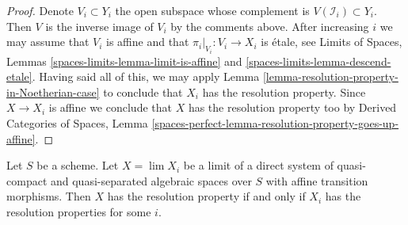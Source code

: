 \begin{proof}
Denote $V_i \subset Y_i$ the open subspace whose complement
is $V(\mathcal{I}_i) \subset Y_i$. Then $V$ is the inverse image
of $V_i$ by the comments above. After increasing $i$ we may assume
that $V_i$ is affine and that $\pi_i|_{V_i} : V_i \to X_i$ is 
\'etale, see
Limits of Spaces, Lemmas
\ref{spaces-limits-lemma-limit-is-affine} and
\ref{spaces-limits-lemma-descend-etale}.
Having said all of this, we may apply
Lemma \ref{lemma-resolution-property-in-Noetherian-case}
to conclude that $X_i$ has the
resolution property. Since $X \to X_i$ is affine
we conclude that $X$ has the resolution property too
by Derived Categories of Spaces, Lemma
\ref{spaces-perfect-lemma-resolution-property-goes-up-affine}.
\end{proof}

\begin{lemma}
\label{lemma-resolution-property-descends}
Let $S$ be a scheme.
Let $X = \lim X_i$ be a limit of a direct system of quasi-compact
and quasi-separated algebraic spaces over $S$ with affine transition morphisms.
Then $X$ has the resolution property if and only if $X_i$ has
the resolution properties for some $i$.
\end{lemma}

